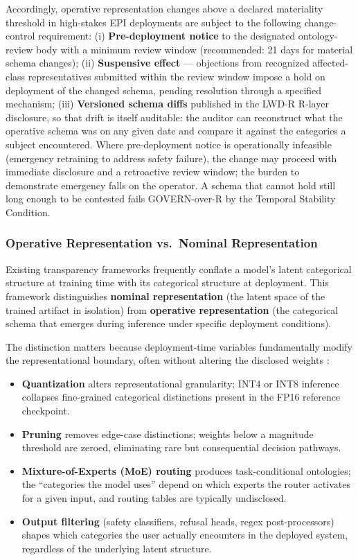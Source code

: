 \documentclass{article}
\theoremstyle{definition}
\begin{document}
Accordingly, operative representation changes above a declared materiality threshold in high-stakes EPI deployments are subject to the following change-control requirement: (i) \textbf{Pre-deployment notice} to the designated ontology-review body with a minimum review window (recommended: 21 days for material schema changes); (ii) \textbf{Suspensive effect} --- objections from recognized affected-class representatives submitted within the review window impose a hold on deployment of the changed schema, pending resolution through a specified mechanism; (iii) \textbf{Versioned schema diffs} published in the LWD-R R-layer disclosure, so that drift is itself auditable: the auditor can reconstruct what the operative schema was on any given date and compare it against the categories a subject encountered. Where pre-deployment notice is operationally infeasible (emergency retraining to address safety failure), the change may proceed with immediate disclosure and a retroactive review window; the burden to demonstrate emergency falls on the operator. A schema that cannot hold still long enough to be contested fails GOVERN-over-R by the Temporal Stability Condition.

\subsubsection{Operative Representation vs.\ Nominal Representation}
\label{subsubsec:operative-r}

Existing transparency frameworks frequently conflate a model's latent categorical structure at training time with its categorical structure at deployment. This framework distinguishes \textbf{nominal representation} (the latent space of the trained artifact in isolation) from \textbf{operative representation} (the categorical schema that emerges during inference under specific deployment conditions).

The distinction matters because deployment-time variables fundamentally modify the representational boundary, often without altering the disclosed weights \citep{hooker2019}:

\begin{itemize}[noitemsep]
    \item \textbf{Quantization} alters representational granularity; INT4 or INT8 inference collapses fine-grained categorical distinctions present in the FP16 reference checkpoint.
    \item \textbf{Pruning} removes edge-case distinctions; weights below a magnitude threshold are zeroed, eliminating rare but consequential decision pathways.
    \item \textbf{Mixture-of-Experts (MoE) routing} produces task-conditional ontologies; the ``categories the model uses'' depend on which experts the router activates for a given input, and routing tables are typically undisclosed.
    \item \textbf{Output filtering} (safety classifiers, refusal heads, regex post-processors) shapes which categories the user actually encounters in the deployed system, regardless of the underlying latent structure.
\end{itemize}
\end{document}
